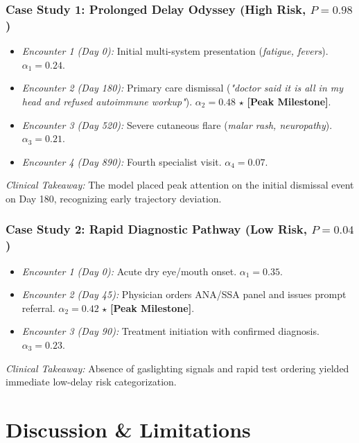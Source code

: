 \documentclass[runningheads]{llncs}
\begin{document}
\subsubsection{Case Study 1: Prolonged Delay Odyssey (High Risk, $P = 0.98$)}
\begin{itemize}
    \item \emph{Encounter 1 (Day 0):} Initial multi-system presentation (\emph{fatigue, fevers}). $\alpha_1 = 0.24$.
    \item \emph{Encounter 2 (Day 180):} Primary care dismissal (\emph{"doctor said it is all in my head and refused autoimmune workup"}). $\alpha_2 = \mathbf{0.48}$ $\star$ \textbf{[Peak Milestone]}.
    \item \emph{Encounter 3 (Day 520):} Severe cutaneous flare (\emph{malar rash, neuropathy}). $\alpha_3 = 0.21$.
    \item \emph{Encounter 4 (Day 890):} Fourth specialist visit. $\alpha_4 = 0.07$.
\end{itemize}
\emph{Clinical Takeaway:} The model placed peak attention on the initial dismissal event on Day 180, recognizing early trajectory deviation.

\subsubsection{Case Study 2: Rapid Diagnostic Pathway (Low Risk, $P = 0.04$)}
\begin{itemize}
    \item \emph{Encounter 1 (Day 0):} Acute dry eye/mouth onset. $\alpha_1 = 0.35$.
    \item \emph{Encounter 2 (Day 45):} Physician orders ANA/SSA panel and issues prompt referral. $\alpha_2 = \mathbf{0.42}$ $\star$ \textbf{[Peak Milestone]}.
    \item \emph{Encounter 3 (Day 90):} Treatment initiation with confirmed diagnosis. $\alpha_3 = 0.23$.
\end{itemize}
\emph{Clinical Takeaway:} Absence of gaslighting signals and rapid test ordering yielded immediate low-delay risk categorization.

\section{Discussion \& Limitations}
\label{sec:discussion}
\end{document}

